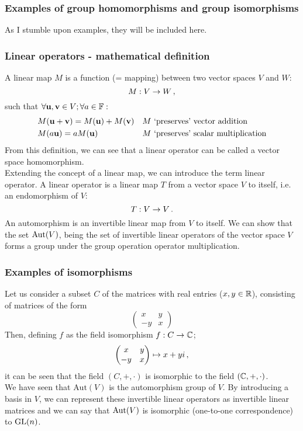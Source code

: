     \subsubsection{Examples of group homomorphisms and group isomorphisms}
        As I stumble upon examples, they will be included here.

    \subsubsection{Linear operators - mathematical definition}
        A linear map $M$ is a function (= mapping) between two vector spaces $V$ and $W$:
        \begin{equation}
            M: V \rightarrow W \thinspace ,
        \end{equation}
        such that $\forall \vb{u}, \vb{v} \in V; \forall a \in \mathbb{F}:$
        \begin{align}
            &M(\vb{u} + \vb{v}) = M(\vb{u}) + M(\vb{v})     && \text{$M$ `preserves' vector addition} \\
            &M(a \vb{u}) = a M(\vb{u})                      && \text{$M$ `preserves' scalar multiplication}
        \end{align}
        From this definition, we can see that a linear operator can be called a vector space homomorphism. \\

        Extending the concept of a linear map, we can introduce the term linear operator. A linear operator is a linear map $T$ from a vector space $V$ to itself, i.e. an endomorphism of $V$:
        \begin{equation}
            T: V \rightarrow V \thinspace .
        \end{equation}
        An automorphism is an invertible linear map from $V$ to itself. We can show that the set $\operatorname{Aut}(V)$, being the set of invertible linear operators of the vector space $V$ forms a group under the group operation operator multiplication.

    \subsubsection{Examples of isomorphisms}
        Let us consider a subset $C$ of the matrices with real entries ($x, y \in \mathbb{R}$), consisting of matrices of the form
        \begin{equation}
            \begin{pmatrix} x & y \\ -y & x \end{pmatrix}
        \end{equation}
        Then, defining $f$ as the field isomorphism $f: C \rightarrow \mathbb{C}$;
        \begin{equation}
            \begin{pmatrix} x & y \\ -y & x \end{pmatrix} \mapsto x + yi \thinspace ,
        \end{equation}
        it can be seen that the field $(C, +, \cdot)$ is isomorphic to the field $(\mathbb{C}, +, \cdot)$. \\

        We have seen that $\text{Aut}(V)$ is the automorphism group of $V$. By introducing a basis in $V$, we can represent these invertible linear operators as invertible linear matrices and we can say that $\operatorname{Aut}(V)$ is isomorphic (one-to-one correspondence) to $\operatorname{GL}(n)$. \\
